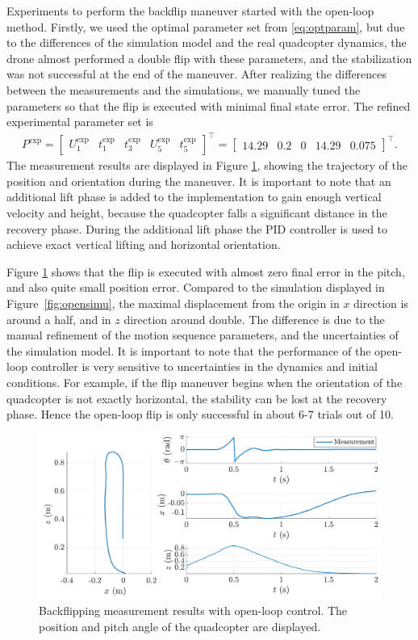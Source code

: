 Experiments to perform the backflip maneuver started with the open-loop method. Firstly, we used the optimal parameter set from \eqref{eq:optparam}, but due to the differences of the simulation model and the real quadcopter dynamics, the drone almost performed a double flip with these parameters, and the stabilization was not successful at the end of the maneuver. After realizing the differences between the measurements and the simulations, we manually tuned the parameters so that the flip is executed with minimal final state error. The refined experimental parameter set is
\begin{align*}
    P^\mathrm{exp} = \begin{bmatrix}
U_1^\mathrm{exp} & t_1^\mathrm{exp} & t_3^\mathrm{exp} & U_5^\mathrm{exp}& t_5^\mathrm{exp}
\end{bmatrix} ^\top =  \begin{bmatrix}
14.29 & 0.2 & 0 & 14.29 & 0.075
\end{bmatrix}^\top.
\end{align*}
The measurement results are displayed in Figure \ref{fig:openmeas}, showing the trajectory of the position and orientation during the maneuver. It is important to note that an additional lift phase is added to the implementation to gain enough vertical velocity and height, because the quadcopter falls a significant distance in the recovery phase. During the additional lift phase the PID controller is used to achieve exact vertical lifting and horizontal orientation.

Figure \ref{fig:openmeas} shows that the flip is executed with almost zero final error in the pitch, and also quite small position error. Compared to the simulation displayed in Figure~\ref{fig:opensimu}, the maximal displacement from the origin in $x$ direction is around a half, and in $z$ direction around double. The difference is due to the manual refinement of the motion sequence parameters, and the uncertainties of the simulation model. It is important to note that the performance of the open-loop controller is very sensitive to uncertainties in the dynamics and initial conditions. For example, if the flip maneuver begins when the orientation of the quadcopter is not exactly horizontal, the stability can be lost at the recovery phase. Hence the open-loop flip is only successful in about 6-7 trials out of 10.
\newpage
\begin{figure}
\centering
\includegraphics[width=.8\linewidth]{Fig/openmeast.pdf}
\caption[Backflipping measurement results with open-loop control]{Backflipping measurement results with open-loop control. The position and pitch angle of the quadcopter are displayed.}\label{fig:openmeas}
\end{figure}

